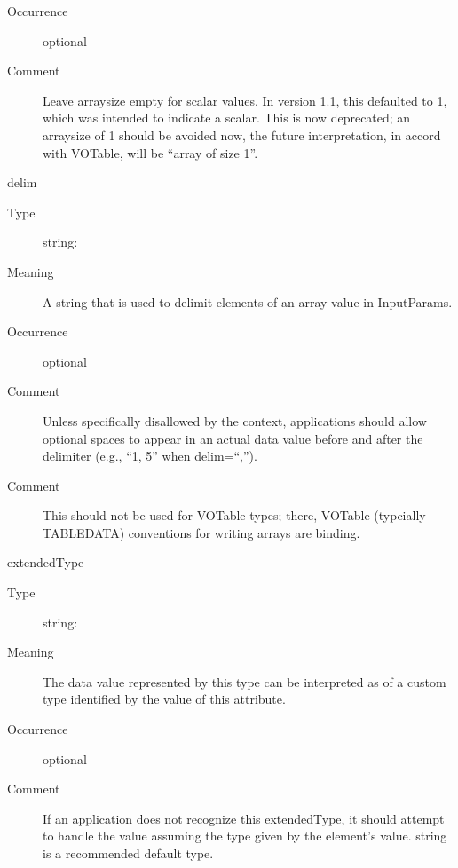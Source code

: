 \documentclass[11pt,a4paper]{ivoa}
\begin{document}
\begin{generated}
\begin{bigdescription}
\begin{description}
\item[Occurrence] optional

\item[Comment]
                     Leave arraysize empty for scalar values.  In version 1.1,
                     this defaulted to 1, which was intended to indicate
                     a scalar.  This is now deprecated; an arraysize of 1 should
                     be avoided now, the future interpretation, in accord with
                     VOTable, will be “array of size 1”.

\end{description}
\item[delim]
\begin{description}
\item[Type] string: 
\item[Meaning]
                     A string that is used to delimit elements of an array
                     value in InputParams.

\item[Occurrence] optional
\item[Comment]
                     Unless specifically disallowed by the context,
                     applications should allow optional spaces to
                     appear in an actual data value before and after
                     the delimiter (e.g., “1, 5” when delim=“,”).

\item[Comment]
                     This should not be used for VOTable types; there,
                     VOTable (typcially TABLEDATA) conventions for writing
                     arrays are binding.

\end{description}
\item[extendedType]
\begin{description}
\item[Type] string: 
\item[Meaning]
                     The data value represented by this type can be
                     interpreted as of a custom type identified by
                     the value of this attribute.

\item[Occurrence] optional
\item[Comment]
                     If an application does not recognize this
                     extendedType, it should attempt to handle the value
                     assuming the type given by the element's value.
                     string is a recommended default type.


\end{description}
\end{bigdescription}
\end{generated}
\end{document}
